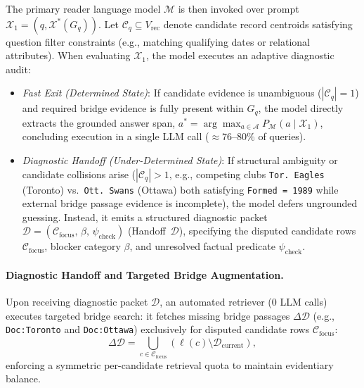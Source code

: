 \documentclass[runningheads]{llncs}
\begin{document}
\enlargethispage{4.5\baselineskip}
The primary reader language model $\mathcal{M}$ is then invoked over prompt $\mathcal{X}_1 = (q, \mathcal{X}^*(G_q))$. Let $\mathcal{C}_q \subseteq V_{\text{rec}}$ denote candidate record centroids satisfying question filter constraints (e.g., matching qualifying dates or relational attributes). When evaluating $\mathcal{X}_1$, the model executes an adaptive diagnostic audit:
\begin{itemize}[leftmargin=1.5em]
    \item \emph{Fast Exit (Determined State)}: If candidate evidence is unambiguous ($|\mathcal{C}_q| = 1$) and required bridge evidence is fully present within $G_q$, the model directly extracts the grounded answer span, $a^* = \arg\max_{a \in \mathcal{A}} P_{\mathcal{M}}(a \mid \mathcal{X}_1)$, concluding execution in a single LLM call ($\approx 76\text{--}80\%$ of queries).
    \item \emph{Diagnostic Handoff (Under-Determined State)}: If structural ambiguity or candidate collisions arise ($|\mathcal{C}_q| > 1$, e.g., competing clubs \texttt{Tor. Eagles} (Toronto) vs.\ \texttt{Ott. Swans} (Ottawa) both satisfying \texttt{Formed = 1989} while external bridge passage evidence is incomplete), the model defers ungrounded guessing. Instead, it emits a structured diagnostic packet $\mathcal{D} = (\mathcal{C}_{\text{focus}}, \, \beta, \, \psi_{\text{check}})$ (Handoff~$\mathcal{D}$), specifying the disputed candidate rows $\mathcal{C}_{\text{focus}}$, blocker category $\beta$, and unresolved factual predicate $\psi_{\text{check}}$.
\end{itemize}

\paragraph{Diagnostic Handoff and Targeted Bridge Augmentation.}
Upon receiving diagnostic packet $\mathcal{D}$, an automated retriever (0 LLM calls) executes targeted bridge search: it fetches missing bridge passages $\Delta\mathcal{D}$ (e.g., \texttt{Doc:Toronto} and \texttt{Doc:Ottawa}) exclusively for disputed candidate rows $\mathcal{C}_{\text{focus}}$:
\begin{equation}
\label{eq:targeted-retrieval}
\Delta \mathcal{D} = \bigcup_{c \in \mathcal{C}_{\text{focus}}} \left( \ell(c) \setminus \mathcal{D}_{\text{current}} \right),
\end{equation}
enforcing a symmetric per-candidate retrieval quota to maintain evidentiary balance.
\end{document}
